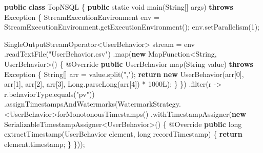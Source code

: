 \documentclass[cn,11pt,chinese]{elegantbook}
\newenvironment{Shaded}{}{}
\newcommand{\AttributeTok}[1]{\textcolor[rgb]{0.49,0.56,0.16}{#1}}
\newcommand{\BuiltInTok}[1]{#1}
\newcommand{\DataTypeTok}[1]{\textcolor[rgb]{0.56,0.13,0.00}{#1}}
\newcommand{\DecValTok}[1]{\textcolor[rgb]{0.25,0.63,0.44}{#1}}
\newcommand{\FunctionTok}[1]{\textcolor[rgb]{0.02,0.16,0.49}{#1}}
\newcommand{\KeywordTok}[1]{\textcolor[rgb]{0.00,0.44,0.13}{\textbf{#1}}}
\newcommand{\NormalTok}[1]{#1}
\newcommand{\StringTok}[1]{\textcolor[rgb]{0.25,0.44,0.63}{#1}}
\begin{document}
\begin{Shaded}
\begin{Highlighting}[]
\KeywordTok{public} \KeywordTok{class}\NormalTok{ TopNSQL \{}
    \KeywordTok{public} \DataTypeTok{static} \DataTypeTok{void} \FunctionTok{main}\NormalTok{(}\BuiltInTok{String}\NormalTok{[] args) }\KeywordTok{throws} \BuiltInTok{Exception}\NormalTok{ \{}
\NormalTok{        StreamExecutionEnvironment env = StreamExecutionEnvironment.}\FunctionTok{getExecutionEnvironment}\NormalTok{();}
\NormalTok{        env.}\FunctionTok{setParallelism}\NormalTok{(}\DecValTok{1}\NormalTok{);}

\NormalTok{        SingleOutputStreamOperator\textless{}UserBehavior\textgreater{} stream = env}
\NormalTok{                .}\FunctionTok{readTextFile}\NormalTok{(}\StringTok{"UserBehavior.csv"}\NormalTok{)}
\NormalTok{                .}\FunctionTok{map}\NormalTok{(}\KeywordTok{new}\NormalTok{ MapFunction\textless{}}\BuiltInTok{String}\NormalTok{, UserBehavior\textgreater{}() \{}
                    \AttributeTok{@Override}
                    \KeywordTok{public}\NormalTok{ UserBehavior }\FunctionTok{map}\NormalTok{(}\BuiltInTok{String}\NormalTok{ value) }\KeywordTok{throws} \BuiltInTok{Exception}\NormalTok{ \{}
                        \BuiltInTok{String}\NormalTok{[] arr = value.}\FunctionTok{split}\NormalTok{(}\StringTok{","}\NormalTok{);}
                        \KeywordTok{return} \KeywordTok{new} \FunctionTok{UserBehavior}\NormalTok{(arr[}\DecValTok{0}\NormalTok{], arr[}\DecValTok{1}\NormalTok{], arr[}\DecValTok{2}\NormalTok{], arr[}\DecValTok{3}\NormalTok{], }\BuiltInTok{Long}\NormalTok{.}\FunctionTok{parseLong}\NormalTok{(arr[}\DecValTok{4}\NormalTok{]) * }\DecValTok{1000L}\NormalTok{);}
\NormalTok{                    \}}
\NormalTok{                \})}
\NormalTok{                .}\FunctionTok{filter}\NormalTok{(r {-}\textgreater{} r.}\FunctionTok{behaviorType}\NormalTok{.}\FunctionTok{equals}\NormalTok{(}\StringTok{"pv"}\NormalTok{))}
\NormalTok{                .}\FunctionTok{assignTimestampsAndWatermarks}\NormalTok{(WatermarkStrategy.\textless{}UserBehavior\textgreater{}}\FunctionTok{forMonotonousTimestamps}\NormalTok{()}
\NormalTok{                        .}\FunctionTok{withTimestampAssigner}\NormalTok{(}\KeywordTok{new}\NormalTok{ SerializableTimestampAssigner\textless{}UserBehavior\textgreater{}() \{}
                            \AttributeTok{@Override}
                            \KeywordTok{public} \DataTypeTok{long} \FunctionTok{extractTimestamp}\NormalTok{(UserBehavior element, }\DataTypeTok{long}\NormalTok{ recordTimestamp) \{}
                                \KeywordTok{return}\NormalTok{ element.}\FunctionTok{timestamp}\NormalTok{;}
\NormalTok{                            \}}
\NormalTok{                        \}));}


\end{Highlighting}
\end{Shaded}
\end{document}
